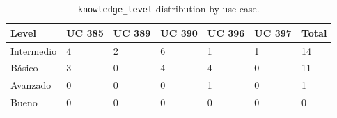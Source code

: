 \documentclass[12pt,a4paper]{article}
\begin{document}
\begin{table}[H]
\centering\small
\begin{tabular}{L{2.8cm} C{1.8cm} C{1.8cm} C{1.8cm} C{1.8cm} C{1.8cm} R{2cm}}
\toprule
\textbf{Level} & \textbf{UC 385} & \textbf{UC 389} & \textbf{UC 390} & \textbf{UC 396} & \textbf{UC 397} & \textbf{Total} \\
\midrule
Intermedio & 4 & 2 & 6 & 1 & 1 & 14 \\
Básico     & 3 & 0 & 4 & 4 & 0 & 11 \\
Avanzado   & 0 & 0 & 0 & 1 & 0 &  1 \\
Bueno      & 0 & 0 & 0 & 0 & 0 &  0 \\
\bottomrule
\end{tabular}
\caption{\texttt{knowledge\_level} distribution by use case.}
\end{table}
\end{document}
